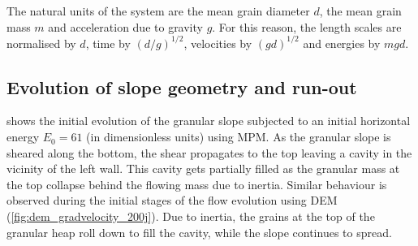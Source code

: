 \documentclass[3p,times,procedia,number]{elsarticle}
\begin{document}
The natural units of the system are the mean grain diameter $d$, the mean grain 
mass $m$ and acceleration due to gravity $g$. For this reason, the length 
scales are normalised by $d$, time by $(d/g)^{1/2}$, velocities by $(gd)^{1/2}$ 
and energies by $mgd$. 

\subsection{Evolution of slope geometry and run-out}
\label{sec:evolution}

 shows the initial evolution of the 
granular slope subjected to an initial horizontal energy $E_0 = 61$ (in 
dimensionless units) using MPM. As the granular slope is sheared along the 
bottom, the shear propagates to the top leaving a cavity in the vicinity of the 
left wall. This cavity gets partially filled as the granular mass at the top 
collapse behind the flowing mass due to inertia. Similar behaviour is observed 
during the initial stages of the flow evolution using DEM  
(\cref{fig:dem_gradvelocity_200j}). Due to inertia, the grains at the top 
of the granular heap roll down to fill the cavity, while the slope continues to 
spread. 
\end{document}

